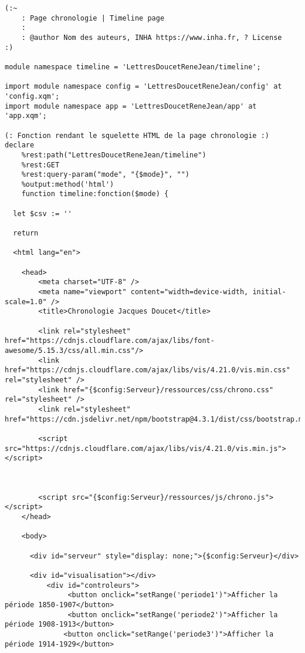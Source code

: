 \begin{verbatim}
(:~ 
    : Page chronologie | Timeline page
    :
    : @author Nom des auteurs, INHA https://www.inha.fr, ? License
:)

module namespace timeline = 'LettresDoucetReneJean/timeline';

import module namespace config = 'LettresDoucetReneJean/config' at 'config.xqm';
import module namespace app = 'LettresDoucetReneJean/app' at 'app.xqm';

(: Fonction rendant le squelette HTML de la page chronologie :)
declare
    %rest:path("LettresDoucetReneJean/timeline")
    %rest:GET
    %rest:query-param("mode", "{$mode}", "")
    %output:method('html')
    function timeline:fonction($mode) {
  
  let $csv := ''
  
  return
  
  <html lang="en">
    
    <head>
        <meta charset="UTF-8" />
        <meta name="viewport" content="width=device-width, initial-scale=1.0" />
        <title>Chronologie Jacques Doucet</title>
        
        <link rel="stylesheet" href="https://cdnjs.cloudflare.com/ajax/libs/font-awesome/5.15.3/css/all.min.css"/>
        <link href="https://cdnjs.cloudflare.com/ajax/libs/vis/4.21.0/vis.min.css" rel="stylesheet" />
        <link href="{$config:Serveur}/ressources/css/chrono.css" rel="stylesheet" />
        <link rel="stylesheet" href="https://cdn.jsdelivr.net/npm/bootstrap@4.3.1/dist/css/bootstrap.min.css"/>
        
        <script src="https://cdnjs.cloudflare.com/ajax/libs/vis/4.21.0/vis.min.js"></script>
        
        
        
        <script src="{$config:Serveur}/ressources/js/chrono.js"></script>
    </head>
    
    <body>
    
      <div id="serveur" style="display: none;">{$config:Serveur}</div> 

      <div id="visualisation"></div>
          <div id="controleurs">
               <button onclick="setRange('periode1')">Afficher la période 1850-1907</button>
               <button onclick="setRange('periode2')">Afficher la période 1908-1913</button>          
              <button onclick="setRange('periode3')">Afficher la période 1914-1929</button>
             

\end{verbatim}
